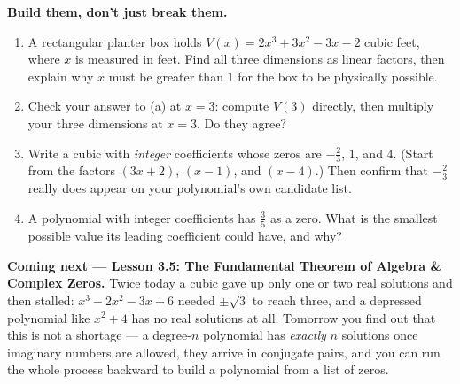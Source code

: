 \documentclass[10pt]{article}
\begin{document}
\begin{extensionbox}
\textbf{Build them, don't just break them.}
\begin{enumerate}[label=(\alph*), leftmargin=1.8em, itemsep=5pt]
  \item A rectangular planter box holds $V(x) = 2x^3 + 3x^2 - 3x - 2$ cubic feet, where $x$ is
        measured in feet. Find all three dimensions as linear factors, then explain why $x$ must be
        greater than $1$ for the box to be physically possible.

  \item Check your answer to (a) at $x = 3$: compute $V(3)$ directly, then multiply your three
        dimensions at $x = 3$. Do they agree?

  \item Write a cubic with \emph{integer} coefficients whose zeros are $-\tfrac23$, $1$, and $4$.
        (Start from the factors $(3x+2)$, $(x-1)$, and $(x-4)$.) Then confirm that $-\tfrac23$ really
        does appear on your polynomial's own candidate list.

  \item A polynomial with integer coefficients has $\tfrac{3}{5}$ as a zero. What is the smallest
        possible value its leading coefficient could have, and why?

\end{enumerate}
\end{extensionbox}

\begin{spiralbox}
\textbf{Coming next --- Lesson 3.5: The Fundamental Theorem of Algebra \& Complex Zeros.} Twice today
a cubic gave up only one or two real solutions and then stalled: $x^3-2x^2-3x+6$ needed
$\pm\sqrt{3}$ to reach three, and a depressed polynomial like $x^2+4$ has no real solutions at all.
Tomorrow you find out that this is not a shortage --- a degree-$n$ polynomial has \emph{exactly} $n$
solutions once imaginary numbers are allowed, they arrive in conjugate pairs, and you can run the
whole process backward to build a polynomial from a list of zeros.
\end{spiralbox}
\end{document}
